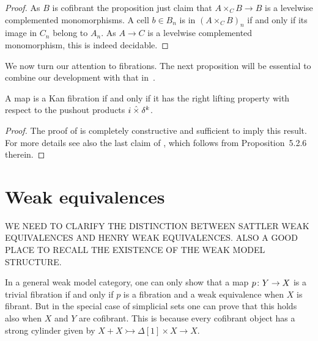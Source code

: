 \documentclass[reqno,10pt,a4paper,oneside,draft]{amsart}
\begin{document}
\begin{proof} As $B$ is cofibrant the proposition just claim that $A \times_C B \rightarrow B$ is a levelwise complemented monomorphisms. A cell $b \in B_n$ is in  $(A \times_C B)_n$ if and only if its image in $C_n$ belong to $A_n$. As $A \rightarrow C$ is a levelwise complemented monomorphism, this is indeed decidable.
\end{proof} 




\bigskip

We now turn our attention to fibrations. The next proposition will be essential to combine our development with that in~\cite{gambino2017frobenius}.




\begin{proposition} A map is a Kan fibration if and only if it has the right lifting property with respect to the pushout products $i \mathbin{\hat{\times}} \delta^k$.
\end{proposition} 

\begin{proof}The proof of \cite[Theorem~3.2.3]{joyal-tierney:simplicial-homotopy-theory} is completely constructive and sufficient to imply this result.
For more details see also the last claim of \cite[Corollary~5.3.2]{henry2018wms}, which follows from Proposition~5.2.6 therein. 
\end{proof}

\section{Weak equivalences} 

WE NEED TO CLARIFY THE DISTINCTION BETWEEN SATTLER WEAK EQUIVALENCES AND HENRY WEAK EQUIVALENCES. ALSO A GOOD PLACE TO RECALL THE EXISTENCE OF THE WEAK MODEL STRUCTURE.


\bigskip

In a general weak model category, one can only show that a map $p \colon Y \to X$ is a trivial fibration
if and only if $p$ is a fibration and a weak equivalence when $X$ is fibrant. But in the special case of simplicial sets one can prove that this holds also when $X$ and $Y$ are cofibrant. This is because every cofibrant object has a strong cylinder given by $X + X \rightarrowtail \Delta[1] \times X \rightarrow X$.
\end{document}
